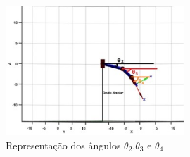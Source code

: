 \begin{figure}[H]
\centering
\includegraphics[width = 0.6\textwidth]{img/thetas.jpg}
\caption[Representação dos ângulos $\theta_2$, $\theta_3$ e $\theta_4$]{Representação dos ângulos $\theta_2$,$\theta_3$ e $\theta_4$}
\label{thetas}
\end{figure}

